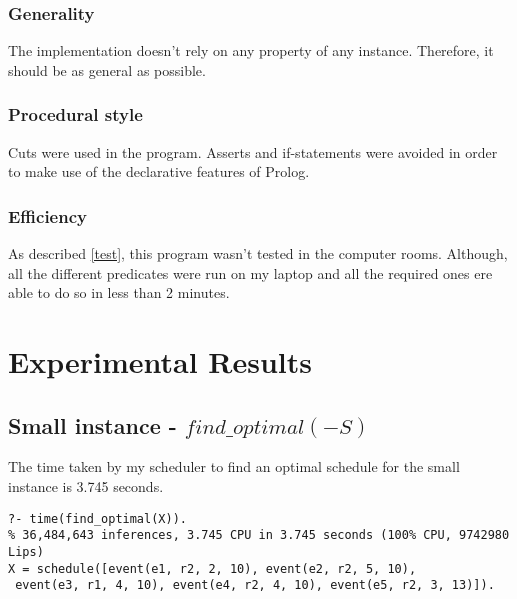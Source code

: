 \documentclass[a4paper]{article}
\begin{document}
\subsubsection{Generality}
The implementation doesn't rely on any property of any instance. Therefore, it should be as general as possible. 


\subsubsection{Procedural style}
Cuts were used in the program. Asserts and if-statements were avoided in order to make use of the declarative features of Prolog.


\subsubsection{Efficiency}
As described \ref{test}, this program wasn't tested in the computer rooms. Although, all the different predicates were run on my laptop and all the required ones ere able to do so in less than 2 minutes.

\section{Experimental Results}
\subsection{Small instance - $find\_optimal(-S)$}
The time taken by my scheduler to find an optimal schedule for the small instance is 3.745 seconds.
\begin{lstlisting}[style=Linux]
?- time(find_optimal(X)).
% 36,484,643 inferences, 3.745 CPU in 3.745 seconds (100% CPU, 9742980 Lips)
X = schedule([event(e1, r2, 2, 10), event(e2, r2, 5, 10),
 event(e3, r1, 4, 10), event(e4, r2, 4, 10), event(e5, r2, 3, 13)]).
\end{lstlisting}
\end{document}
